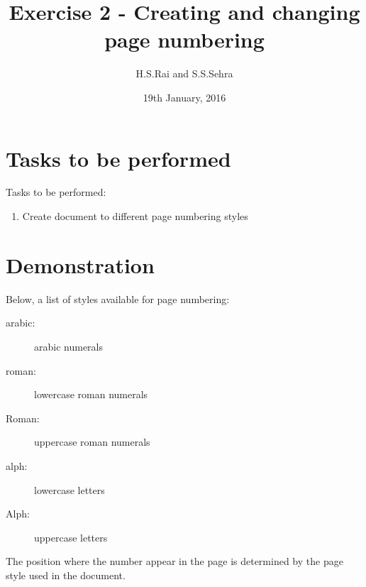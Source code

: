 \documentclass{article}
\title{Exercise 2 - Creating and changing page numbering}
\author{H.S.Rai and S.S.Sehra}
\date{19th January, 2016}
\begin{document}
\maketitle
	
\section*{Tasks to be performed}
Tasks to be performed:
\begin{enumerate}
		\item Create document to different page numbering styles
	\end{enumerate}
	\section*{Demonstration}

Below, a list of styles available for page numbering:


\begin{description}
\item[arabic:] arabic numerals

\item[roman:] lowercase roman numerals

\item[Roman:] uppercase roman numerals

\item[alph:] lowercase letters

\item[Alph:] uppercase letters
\end{description}

The position where the number appear in the page is determined by the
page style used in the document.
\end{document}
